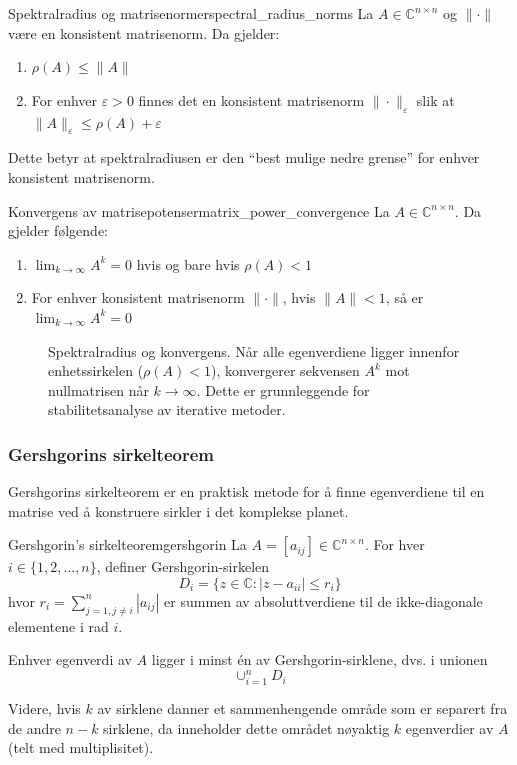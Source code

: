 \documentclass[../../main.tex]{subfiles}
\begin{document}
\begin{theorem}{Spektralradius og matrisenormer}{spectral_radius_norms}
    La $A \in \mathbb{C}^{n \times n}$ og $\|\cdot\|$ være en konsistent matrisenorm. Da gjelder:
    \begin{enumerate}
        \item $\rho(A) \leq \|A\|$
        \item For enhver $\varepsilon > 0$ finnes det en konsistent matrisenorm $\|\cdot\|_\varepsilon$ slik at $\|A\|_\varepsilon \leq \rho(A) + \varepsilon$
    \end{enumerate}
\end{theorem}

Dette betyr at spektralradiusen er den \enquote{best mulige nedre grense} for enhver konsistent matrisenorm.

\begin{remark}{Konvergens av matrisepotenser}{matrix_power_convergence}
    La $A \in \mathbb{C}^{n \times n}$. Da gjelder følgende:
    \begin{enumerate}
        \item $\lim_{k \to \infty} A^k = 0$ hvis og bare hvis $\rho(A) < 1$
        \item For enhver konsistent matrisenorm $\|\cdot\|$, hvis $\|A\| < 1$, så er $\lim_{k \to \infty} A^k = 0$
    \end{enumerate}
\end{remark}

\begin{figure}
    \centering
    
    \caption{Spektralradius og konvergens. Når alle egenverdiene ligger innenfor enhetssirkelen ($\rho(A) < 1$), konvergerer sekvensen $A^k$ mot nullmatrisen når $k \to \infty$. Dette er grunnleggende for stabilitetsanalyse av iterative metoder.}
    \label{fig:spectral_radius}
\end{figure}

\subsubsection{Gershgorins sirkelteorem}
Gershgorins sirkelteorem er en praktisk metode for å finne egenverdiene til en matrise ved å konstruere sirkler i det komplekse planet.

\begin{theorem}{Gershgorin's sirkelteorem}{gershgorin}
    La $A = [a_{ij}] \in \mathbb{C}^{n \times n}$. For hver $i \in \{1,2,\ldots,n\}$, definer Gershgorin-sirkelen
    \[
        D_i = \{z \in \mathbb{C} : |z - a_{ii}| \leq r_i\}
    \]
    hvor $r_i = \sum_{j=1,j\neq i}^{n} |a_{ij}|$ er summen av absoluttverdiene til de ikke-diagonale elementene i rad $i$.

    Enhver egenverdi av $A$ ligger i minst én av Gershgorin-sirklene, dvs. i unionen
    \[
        \cup_{i=1}^{n} D_i
    \]

    Videre, hvis $k$ av sirklene danner et sammenhengende område som er separert fra de andre $n-k$ sirklene, da inneholder dette området nøyaktig $k$ egenverdier av $A$ (telt med multiplisitet).
\end{theorem}
\end{document}
